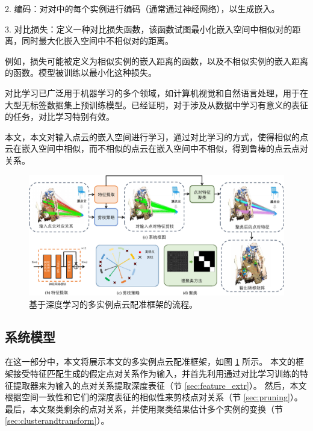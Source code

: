 2. 编码：对对中的每个实例进行编码（通常通过神经网络），以生成嵌入。

3. 对比损失：定义一种对比损失函数，该函数试图最小化嵌入空间中相似对的距离，同时最大化嵌入空间中不相似对的距离。

例如，损失可能被定义为相似实例的嵌入距离的函数，以及不相似实例的嵌入距离的函数。模型被训练以最小化这种损失。

对比学习已广泛用于机器学习的多个领域，如计算机视觉和自然语言处理，用于在大型无标签数据集上预训练模型。已经证明，对于涉及从数据中学习有意义的表征的任务，对比学习特别有效\cite{tian2020makes}。

本文，本文对输入点云的嵌入空间进行学习，通过对比学习的方式，使得相似的点云在嵌入空间中相似，而不相似的点云在嵌入空间中不相似，得到鲁棒的点云点对关系。

\begin{figure}[ht]
    \centering
    \includegraphics[width=1.0\textwidth]{images/pointcorr.pdf}
    \caption{
        基于深度学习的多实例点云配准框架的流程。     
    }
    \label{fig:point-pipeline}
    \vspace{-0.5in}
  \end{figure}

\subsection{系统模型}
在这一部分中，本文将展示本文的多实例点云配准框架，如图 \ref{fig:point-pipeline} 所示。
本文的框架接受特征匹配生成的假定点对关系作为输入，并首先利用通过对比学习训练的特征提取器来为输入的点对关系提取深度表征（节 \ref{sec:feature_extr}）。
然后，本文根据空间一致性和它们的深度表征的相似性来剪枝点对关系（节 \ref{sec:pruning}）。
最后，本文聚类剩余的点对关系，并使用聚类结果估计多个实例的变换（节 \ref{sec:clusterandtransform}）。

